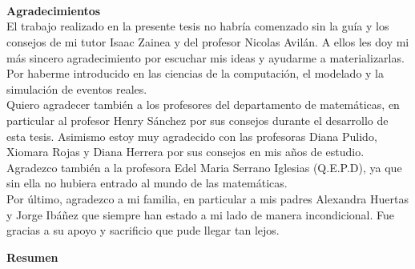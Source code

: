 \newpage{\pagestyle{empty}\cleardoublepage}


\begin{flushright}
\begin{minipage}{8cm}
    \noindent
        \small
\end{minipage}
\end{flushright}

\newpage{\pagestyle{empty}\cleardoublepage}

\newpage
\thispagestyle{empty} \textbf{}\normalsize
\\\\\\%
\textbf{\LARGE Agradecimientos}\\

El trabajo realizado en la presente tesis no habría comenzado sin la guía y los consejos de mi tutor Isaac Zainea y del profesor Nicolas Avilán. A ellos les doy mi más sincero agradecimiento por escuchar mis ideas y ayudarme a materializarlas. Por haberme introducido en las ciencias de la computación, el modelado y la simulación de eventos reales. \\

Quiero agradecer también a los profesores del departamento de matemáticas, en particular al profesor Henry Sánchez por sus consejos durante el desarrollo de esta tesis. Asimismo estoy muy agradecido con las profesoras Diana Pulido, Xiomara Rojas y Diana Herrera por sus consejos en mis años de estudio. Agradezco también a la profesora Edel Maria Serrano Iglesias (Q.E.P.D), ya que sin ella no hubiera entrado al mundo de las matemáticas. \\

Por último, agradezco a mi familia, en particular a mis padres Alexandra Huertas y Jorge Ibáñez que siempre han estado a mi lado de manera incondicional. Fue gracias a su apoyo y sacrificio que pude llegar tan lejos.

\newpage{\pagestyle{empty}\cleardoublepage}

\newpage
\textbf{\LARGE Resumen}\\

